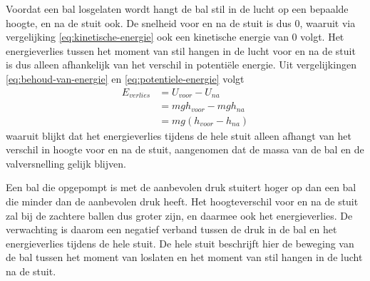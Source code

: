 \documentclass[11pt,a4paper]{article}
\begin{document}
Voordat een bal losgelaten wordt hangt de bal stil in de lucht op een bepaalde hoogte, en na de stuit ook. De snelheid voor en na de stuit is dus 0, waaruit via vergelijking \ref{eq:kinetische-energie} ook een kinetische energie van 0 volgt. Het energieverlies tussen het moment van stil hangen in de lucht voor en na de stuit is dus alleen afhankelijk van het verschil in potentiële energie. Uit vergelijkingen \ref{eq:behoud-van-energie} en \ref{eq:potentiele-energie} volgt
\begin{equation}
\begin{align*}
E_{verlies} &= U_{voor} - U_{na}\\
&= mgh_{voor} - mgh_{na}\\
&= mg(h_{voor} - h_{na})
\label{eq:energieverlies}
\end{align*}
\end{equation}
waaruit blijkt dat het energieverlies tijdens de hele stuit alleen afhangt van het verschil in hoogte voor en na de stuit, aangenomen dat de massa van de bal en de valversnelling gelijk blijven.

Een bal die opgepompt is met de aanbevolen druk stuitert hoger op dan een bal die minder dan de aanbevolen druk heeft. Het hoogteverschil voor en na de stuit zal bij de zachtere ballen dus groter zijn, en daarmee ook het energieverlies. De verwachting is daarom een negatief verband tussen de druk in de bal en het energieverlies tijdens de hele stuit. De hele stuit beschrijft hier de beweging van de bal tussen het moment van loslaten en het moment van stil hangen in de lucht na de stuit.
\end{document}
